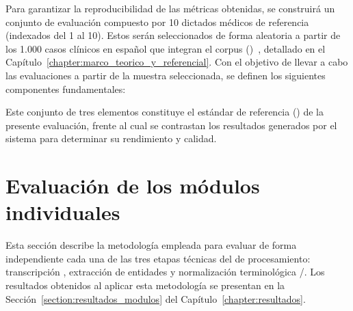 Para garantizar la reproducibilidad de las métricas obtenidas, se construirá un conjunto de evaluación
compuesto por 10 dictados médicos de referencia (indexados del 1 al 10). Estos serán seleccionados
de forma aleatoria a partir de los 1.000 casos clínicos en español que integran el corpus
 ()~, detallado en el
Capítulo~\ref{chapter:marco_teorico_y_referencial}. Con el objetivo de llevar a cabo las evaluaciones
a partir de la muestra seleccionada, se definen los siguientes componentes fundamentales:




Este conjunto de tres elementos constituye el estándar de referencia ()
de la presente evaluación, frente al cual se contrastan los resultados generados por el sistema
para determinar su rendimiento y calidad.


\section{Evaluación de los módulos individuales}\label{section:evaluacion_modulos}

Esta sección describe la metodología empleada para evaluar de forma independiente cada una de las
tres etapas técnicas del  de procesamiento: transcripción ,
extracción de entidades  y normalización terminológica /. Los resultados obtenidos al aplicar esta metodología se presentan en la
Sección~\ref{section:resultados_modulos} del Capítulo~\ref{chapter:resultados}.

